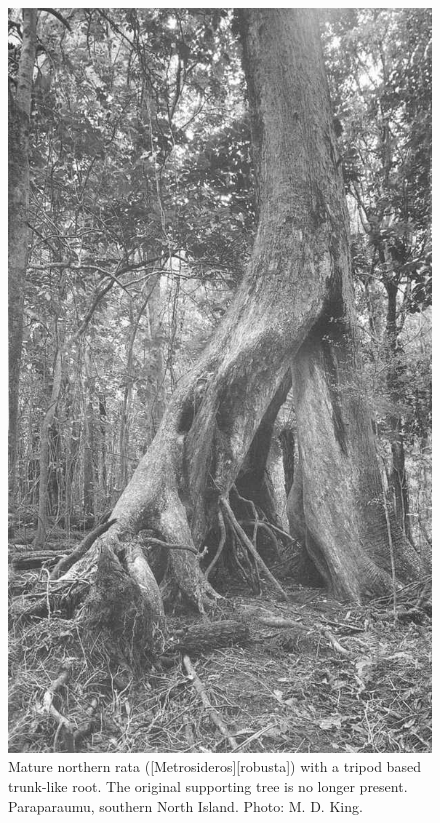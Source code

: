 \begin{figure}[!htb]
\begin{minipage}[t]{0.45\textwidth}
    	\includegraphics[width=\textwidth]{graphics/figure51rata.jpg}
    	\caption[Mature northern rata with a tripod based trunk-like root]{Mature northern rata ([Metrosideros][robusta]) with a tripod based trunk-like root.
    	The original supporting tree is no longer present.
    	Paraparaumu, southern North Island.
    	Photo: M. D. King.}%
    	\label{fig:51rata}
	\end{minipage}
\end{figure}

